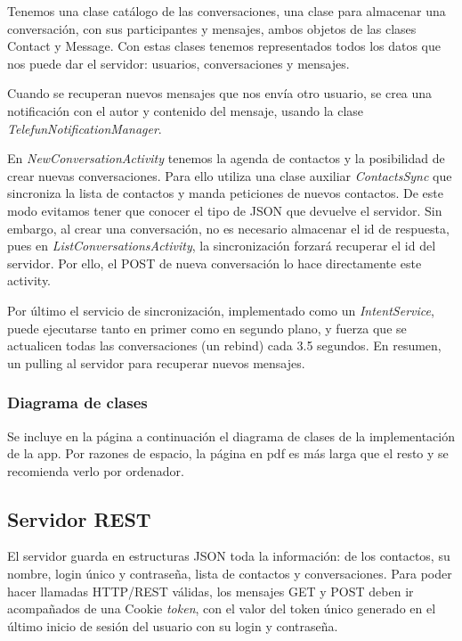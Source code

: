 \documentclass[]{article}
\begin{document}
Tenemos una clase catálogo de las conversaciones, una clase para almacenar una conversación, con sus participantes y mensajes, ambos objetos de las clases Contact y Message. Con estas clases tenemos representados todos los datos que nos puede dar el servidor: usuarios, conversaciones y mensajes.

Cuando se recuperan nuevos mensajes que nos envía otro usuario, se crea una notificación con el autor y contenido del mensaje, usando la clase \textit{TelefunNotificationManager}.

\hfill

En \textit{NewConversationActivity} tenemos la agenda de contactos y la posibilidad de crear nuevas conversaciones. Para ello utiliza una clase auxiliar \textit{ContactsSync} que sincroniza la lista de contactos y manda peticiones de nuevos contactos. De este modo evitamos tener que conocer el tipo de JSON que devuelve el servidor. Sin embargo, al crear una conversación, no es necesario almacenar el id de respuesta, pues en \textit{ListConversationsActivity}, la sincronización forzará recuperar el id del servidor. Por ello, el POST de nueva conversación lo hace directamente este activity.

\hfill

Por último el servicio de sincronización, implementado como un \textit{IntentService}, puede ejecutarse tanto en primer como en segundo plano, y fuerza que se actualicen todas las conversaciones (un rebind) cada 3.5 segundos. En resumen, un pulling al servidor para recuperar nuevos mensajes.

\hfill



\subsubsection{Diagrama de clases}

Se incluye en la página a continuación el diagrama de clases de la implementación de la app. Por razones de espacio, la página en pdf es más larga que el resto y se recomienda verlo por ordenador.



\subsection{Servidor REST}

El servidor guarda en estructuras JSON toda la información: de los contactos, su nombre, login único y contraseña, lista de contactos y conversaciones. Para poder hacer llamadas HTTP/REST válidas, los mensajes GET y POST deben ir acompañados de una Cookie \textit{token}, con el valor del token único generado en el último inicio de sesión del usuario con su login y contraseña.
\end{document}
